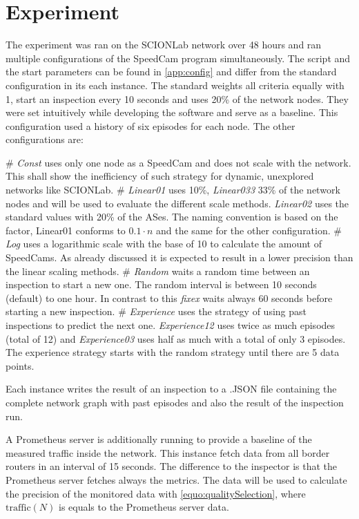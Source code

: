 \documentclass[thesis.tex]{subfiles}
\begin{document}
\section{Experiment}

The experiment was ran on the SCIONLab network over 48 hours and ran multiple configurations of the SpeedCam program simultaneously. The script and the start parameters can be found in \autoref{app:config} and differ from the standard configuration in its each instance. The standard weights all criteria equally with 1, start an inspection every 10 seconds and uses 20\% of the network nodes. They were set intuitively while developing the software and serve as a baseline. This configuration used a history of six episodes for each node. The other configurations are:

\begin{easylist}
	\MyListProperties
	# \textit{Const} uses only one node as a SpeedCam and does not scale with the network. This shall show the inefficiency of such strategy for dynamic, unexplored networks like SCIONLab.
	# \textit{Linear01} uses 10\%, \textit{Linear033} 33\% of the network nodes and will be used to evaluate the different scale methods. \textit{Linear02} uses the standard values with 20\% of the ASes. The naming convention is based on the factor, Linear01 conforms to $0.1 \cdot n$ and the same for the other configuration.
	# \textit{Log} uses a logarithmic scale with the base of 10 to calculate the amount of SpeedCams. As already discussed it is expected to result in a lower precision than the linear scaling methods.
	# \textit{Random} waits a random time between an inspection to start a new one. The random interval is between 10 seconds (default) to one hour. In contrast to this \textit{fixex} waits always 60 seconds before starting a new inspection.
	# \textit{Experience} uses the strategy of using past inspections to predict the next one. \textit{Experience12} uses twice as much episodes (total of 12) and \textit{Experience03} uses half as much with a total of only 3 episodes. The experience strategy starts with the random strategy until there are 5 data points.		
\end{easylist}

Each instance writes the result of an inspection to a .JSON file containing the complete network graph with past episodes and also the result of the inspection run. 

A Prometheus server is additionally running to provide a baseline of the measured traffic inside the network. This instance fetch data from all border routers in an interval of 15 seconds. The difference to the inspector is that the Prometheus server fetches always the metrics. The data will be used to calculate the precision of the monitored data with \autoref{equo:qualitySelection}, where $\text{traffic}(N)$ is equals to the Prometheus server data. 
\end{document}
